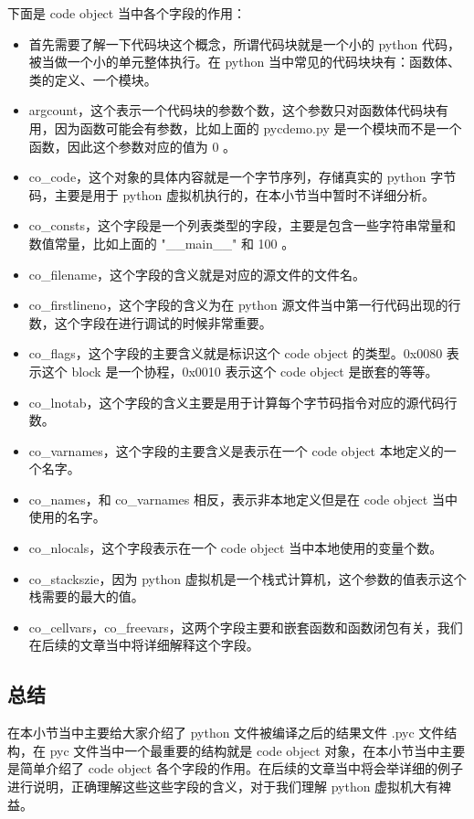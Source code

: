 下面是 code object 当中各个字段的作用：
\begin{itemize}
\item 首先需要了解一下代码块这个概念，所谓代码块就是一个小的 python 代码，被当做一个小的单元整体执行。在 python 当中常见的代码块块有：函数体、类的定义、一个模块。 
\item argcount，这个表示一个代码块的参数个数，这个参数只对函数体代码块有用，因为函数可能会有参数，比如上面的 pycdemo.py 是一个模块而不是一个函数，因此这个参数对应的值为 0 。 
\item co\_code，这个对象的具体内容就是一个字节序列，存储真实的 python 字节码，主要是用于 python 虚拟机执行的，在本小节当中暂时不详细分析。 
\item co\_consts，这个字段是一个列表类型的字段，主要是包含一些字符串常量和数值常量，比如上面的 "\_\_main\_\_" 和 100 。 
\item co\_filename，这个字段的含义就是对应的源文件的文件名。 
\item co\_firstlineno，这个字段的含义为在 python 源文件当中第一行代码出现的行数，这个字段在进行调试的时候非常重要。 
\item co\_flags，这个字段的主要含义就是标识这个 code object 的类型。0x0080 表示这个 block 是一个协程，0x0010 表示这个 code object 是嵌套的等等。 
\item co\_lnotab，这个字段的含义主要是用于计算每个字节码指令对应的源代码行数。 
\item co\_varnames，这个字段的主要含义是表示在一个 code object 本地定义的一个名字。 
\item co\_names，和 co\_varnames 相反，表示非本地定义但是在 code object 当中使用的名字。 
\item co\_nlocals，这个字段表示在一个 code object 当中本地使用的变量个数。 
\item co\_stackszie，因为 python 虚拟机是一个栈式计算机，这个参数的值表示这个栈需要的最大的值。 
\item co\_cellvars，co\_freevars，这两个字段主要和嵌套函数和函数闭包有关，我们在后续的文章当中将详细解释这个字段。 
\end{itemize}
\subsection{总结}
在本小节当中主要给大家介绍了 python 文件被编译之后的结果文件 .pyc 文件结构，在 pyc 文件当中一个最重要的结构就是 code object 对象，在本小节当中主要是简单介绍了 code object 各个字段的作用。在后续的文章当中将会举详细的例子进行说明，正确理解这些这些字段的含义，对于我们理解 python 虚拟机大有裨益。


